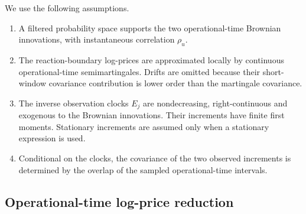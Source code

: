 \documentclass[5p,final]{elsarticle}
\begin{document}
We use the following assumptions.
\begin{enumerate}
\item[(A1)] A filtered probability space supports the two operational-time Brownian innovations, with instantaneous correlation $\rho_u$.
\item[(A2)] The reaction-boundary log-prices are approximated locally by continuous operational-time semimartingales. Drifts are omitted because their short-window covariance contribution is lower order than the martingale covariance.
\item[(A3)] The inverse observation clocks $E_j$ are nondecreasing, right-continuous and exogenous to the Brownian innovations. Their increments have finite first moments. Stationary increments are assumed only when a stationary expression is used.
\item[(A4)] Conditional on the clocks, the covariance of the two observed increments is determined by the overlap of the sampled operational-time intervals.
\end{enumerate}

\subsection{Operational-time log-price reduction}
\end{document}
